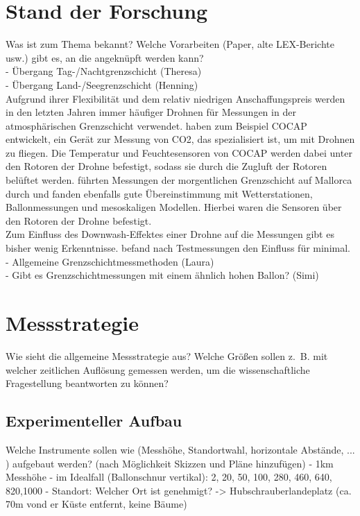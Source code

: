 \documentclass[a4paper,11pt,DIV=calc,tablecaptionabove,headinclude,twoside]{article}
\begin{document}
\section{Stand der Forschung}
Was ist zum Thema bekannt? Welche Vorarbeiten (Paper, alte LEX-Berichte usw.) gibt es, an die angeknüpft werden kann?\\
- Übergang Tag-/Nachtgrenzschicht (Theresa)\\
- Übergang Land-/Seegrenzschicht (Henning)\\
Aufgrund ihrer Flexibilität und dem relativ niedrigen Anschaffungspreis werden
in den letzten Jahren immer häufiger Drohnen für Messungen in der atmosphärischen
Grenzschicht verwendet.
\citet{kunz2018cocap} haben zum Beispiel COCAP entwickelt, ein Gerät zur Messung von
CO2, das spezialisiert ist, um mit Drohnen zu fliegen. Die Temperatur und Feuchtesensoren
von COCAP werden dabei unter den Rotoren der Drohne befestigt, sodass sie durch die 
Zugluft der Rotoren belüftet werden. \citet{jimenez2016morning} führten Messungen der morgentlichen Grenzschicht
auf Mallorca durch und fanden ebenfalls gute Übereinstimmung mit Wetterstationen, 
Ballonmessungen und mesoskaligen Modellen. Hierbei waren die Sensoren über den Rotoren
der Drohne befestigt.\\
Zum Einfluss des Downwash-Effektes einer Drohne auf die Messungen gibt es bisher
wenig Erkenntnisse. \citet{zhou2017small} befand nach Testmessungen den Einfluss für
minimal.\\
- Allgemeine Grenzschichtmessmethoden (Laura)\\
- Gibt es Grenzschichtmessungen mit einem ähnlich hohen Ballon? (Simi)


\section{Messstrategie}
Wie sieht die allgemeine Messstrategie aus? Welche Größen sollen z.~B. mit welcher zeitlichen Auflösung gemessen werden, um die wissenschaftliche Fragestellung beantworten zu können?
\subsection{Experimenteller Aufbau}
Welche Instrumente sollen wie (Messhöhe, Standortwahl, horizontale Abstände, ... ) aufgebaut werden? (nach Möglichkeit Skizzen und Pläne hinzufügen)
- 1km Messhöhe
- im Idealfall (Ballonschnur vertikal): 2, 20, 50, 100, 280, 460, 640, 820,1000 %
- Standort: Welcher Ort ist genehmigt? -> Hubschrauberlandeplatz (ca. 70m vond er Küste entfernt, keine Bäume)
\end{document}
